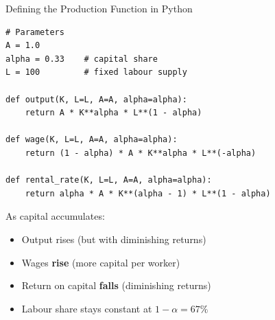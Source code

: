 \documentclass[aspectratio=169, 10pt]{beamer}
\begin{document}
\begin{frame}[fragile]{Defining the Production Function in Python}
\begin{lstlisting}
# Parameters
A = 1.0
alpha = 0.33    # capital share
L = 100         # fixed labour supply

def output(K, L=L, A=A, alpha=alpha):
    return A * K**alpha * L**(1 - alpha)

def wage(K, L=L, A=A, alpha=alpha):
    return (1 - alpha) * A * K**alpha * L**(-alpha)

def rental_rate(K, L=L, A=A, alpha=alpha):
    return alpha * A * K**(alpha - 1) * L**(1 - alpha)
\end{lstlisting}
\vspace{0.3em}
As capital accumulates:
\begin{itemize}
  \item Output rises (but with diminishing returns)
  \item Wages \textbf{rise} (more capital per worker)
  \item Return on capital \textbf{falls} (diminishing returns)
  \item Labour share stays constant at $1-\alpha = 67\%$
\end{itemize}
\end{frame}
\end{document}
